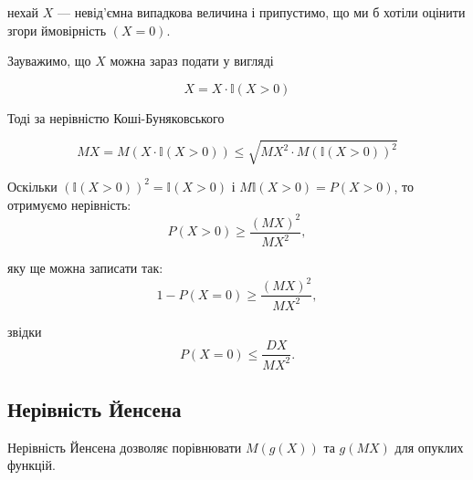\begin{example}
    нехай $X$ --- невід'ємна випадкова величина і
    припустимо, що ми б
    хотіли оцінити згори ймовірність $(X = 0)$.
    
    Зауважимо, що $X$ можна зараз подати у вигляді 

    $$X = X \cdot \mathbb{I}(X > 0)$$
    
    Тоді за нерівністю Коші-Буняковського 

    $$MX = M(X \cdot \mathbb{I}(X>0)) \leqslant \sqrt{MX^2 \cdot M(\mathbb{I}(X>0))^2}$$
    
    Оскільки $(\mathbb{I}(X > 0))^2 = \mathbb{I}(X > 0)$ і
    $M\mathbb{I}(X > 0) = P(X>0)$, то 
    отримуємо нерівність: 
    $$P(X>0) \geqslant \dfrac{(MX)^2}{MX^2},$$
    
    яку ще можна записати так:
    $$1- P(X=0) \geqslant \dfrac{(MX)^2}{MX^2},$$
    
    звідки
    $$P(X=0) \leqslant \dfrac{DX}{MX^2}.$$
\end{example}

\subsection{Нерівність Йенсена}

Нерівність Йенсена дозволяє порівнювати $M(g(X))$ та 
$g(MX)$ для опуклих функцій.

